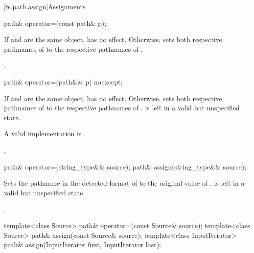 [fs.path.assign]{Assignments}

%
\begin{itemdecl}
path& operator=(const path& p);
\end{itemdecl}

\begin{itemdescr}
\pnum
\effects
If  and  are the same
object, has no effect.
Otherwise,
sets both respective pathnames of 
to the respective pathnames of .

\pnum
\returns
{}.
\end{itemdescr}

%
\begin{itemdecl}
path& operator=(path&& p) noexcept;
\end{itemdecl}

\begin{itemdescr}
\pnum
\effects
If  and  are the same
object, has no effect. Otherwise,
sets both respective pathnames of 
to the respective pathnames of .
 is left in a valid but unspecified state.
\begin{note}
A valid implementation is .
\end{note}

\pnum
\returns
{}.
\end{itemdescr}

%
%
\begin{itemdecl}
path& operator=(string_type&& source);
path& assign(string_type&& source);
\end{itemdecl}

\begin{itemdescr}
\pnum
\effects
Sets the pathname in the detected-format of 
to the original value of .
 is left in a valid but unspecified state.

\pnum
\returns
{}.
\end{itemdescr}

%
%
\begin{itemdecl}
template<class Source>
  path& operator=(const Source& source);
template<class Source>
  path& assign(const Source& source);
template<class InputIterator>
  path& assign(InputIterator first, InputIterator last);
\end{itemdecl}

